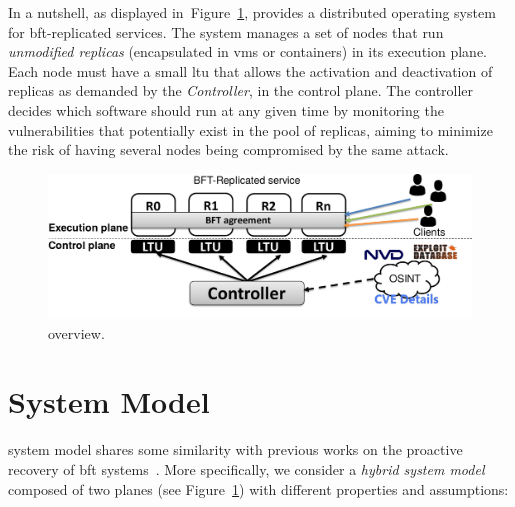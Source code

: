 


In a nutshell, as displayed in~Figure~\ref{fig:overview}, \system provides a distributed operating system for \gls{bft}-replicated services.
The system manages a set of nodes that run \emph{unmodified replicas} (encapsulated in \glspl{vm} or containers) in its execution plane. 
Each node must have a small \gls{ltu} that allows the activation and deactivation of replicas as demanded by the \system \emph{Controller}, in the control plane.
The controller decides which software should run at any given time by monitoring the vulnerabilities that potentially exist in the pool of replicas, aiming to minimize the risk of having several nodes being compromised by the same attack.

\begin{figure}[t]
\begin{center}
\includegraphics[width=0.8\columnwidth]{images/images/overview.pdf}
\caption{\system overview.}
\label{fig:overview}
\end{center}
\end{figure}


\section{System Model}
\label{sec:systemmodel}

\system system model shares some similarity with previous works on the proactive recovery of \gls{bft} systems~\cite{Castro:2002,Platania:2014,Sousa:2010,Roeder:2010}.
More specifically, we consider a \emph{hybrid system model} composed of two planes (see Figure~\ref{fig:overview}) with different properties and assumptions:

